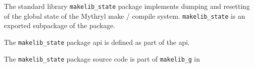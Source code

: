 
The standard library {\tt makelib\_state} package implements dumping and resetting of 
the global state of the Mythryl make / compile system.  {\tt makelib\_state} is an 
exported subpackage of the  package.

The {\tt makelib\_state} package api is defined as part of the  
 api.

The {\tt makelib\_state} package source code is part of {\tt makelib\_g} in 
